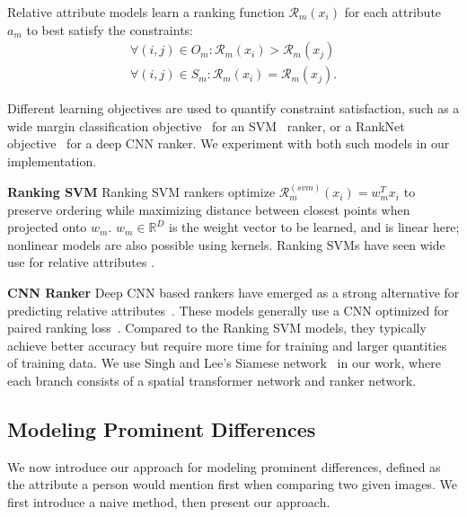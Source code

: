 \documentclass[10pt,twocolumn,letterpaper]{article}
\begin{document}
Relative attribute models learn a ranking function $\mathcal{R}_m(x_i)$ for each attribute $a_m$ to best satisfy the constraints:
\begin{align}
    \forall (i, j) \in O_m : \mathcal{R}_m(x_i) > \mathcal{R}_m(x_j) \\
    \forall (i, j) \in S_m : \mathcal{R}_m(x_i) = \mathcal{R}_m(x_j).
\end{align}

Different learning objectives are used to quantify constraint satisfaction, such as a wide margin classification objective~\cite{relativeattributes} for an SVM~\cite{ranksvm} ranker, or a RankNet objective~\cite{deeprelative, deeprelative2, deeprelative3, ranknet} for a deep CNN ranker. We experiment with both such models in our implementation.

\vspace{0.22cm}

\noindent \textbf{Ranking SVM} \hspace{1em} Ranking SVM rankers optimize $\mathcal{R}_m^{(svm)}(x_i) = w_m^T x_i$ to preserve ordering while maximizing distance between closest points when projected onto $w_m$. $w_m \in \mathbb{R}^D$ is the weight vector to be learned, and is linear here; nonlinear models are also possible using kernels. Ranking SVMs have seen wide use for relative attributes \cite{relativeattributes, virality, robustsubjective, whittlesearch, partattribute, finegrained}.

\vspace{0.22cm}

\noindent \textbf{CNN Ranker} \hspace{1em} Deep CNN based rankers have emerged as a strong alternative for predicting relative attributes~\cite{deeprelative, deeprelative2, deeprelative3}. These models generally use a CNN optimized for paired ranking loss~\cite{ranknet}. Compared to the Ranking SVM models, they typically achieve better accuracy but require more time for training and larger quantities of training data. We use Singh and Lee's Siamese network~\cite{deeprelative} in our work, where each branch consists of a spatial transformer network and ranker network.

\subsection{Modeling Prominent Differences} \label{modeling}

We now introduce our approach for modeling prominent differences, defined as the attribute a person would mention first when comparing two given images. We first introduce a naive method, then present our approach.
\end{document}
